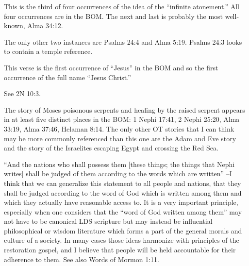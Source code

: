 \begin{compactdesc}
		\item[16$\vert$]
		\begin{compactdesc}
		\item[infinite atonement] This is the third of four occurrences of the idea of the ``infinite atonement.'' All four occurrences are in the BOM. The next and last is probably the most well-known, Alma 34:12.

		\item[pure hearts and clean hands] The only other two instances are Psalms 24:4 and Alma 5:19. Psalms 24:3 looks to contain a temple reference.
		\end{compactdesc}

		\item[19$\vert$]
		\begin{compactdesc}
		\item[Jesus] This verse is the first occurrence of ``Jesus'' in the BOM and so the first occurrence of the full name ``Jesus Christ.''

		\item[And according to the words of the prophets...] See 2N 10:3.
		\end{compactdesc}

		\item[20$\vert$]
		\begin{compactdesc}
		\item[poisonous serpents] The story of Moses poisonous serpents and healing by the raised serpent appears in at least five distinct places in the BOM: 1 Nephi 17:41, 2 Nephi 25:20, Alma 33:19, Alma 37:46, Helaman 8:14. The only other OT stories that I can think may be more commonly referenced than this one are the Adam and Eve story and the story of the Israelites escaping Egypt and crossing the Red Sea.
		\end{compactdesc}

		\item[22$\vert$]
		\begin{compactdesc}
		\item[shall be judged of them] ``And the nations who shall possess them [these things; the things that Nephi writes] shall be judged of them according to the words which are written'' --I think that we can generalize this statement to all people and nations, that they shall be judged according to the word of God which is written among them and which they actually have reasonable access to. It is a very important principle, especially when one considers that the ``word of God written among them'' may not have to be canonical LDS scripture but may instead be influential philosophical or wisdom literature which forms a part of the general morals and culture of a society. In many cases those ideas harmonize with principles of the restoration gospel, and I believe that people will be held accountable for their adherence to them. See also Words of Mormon 1:11.
		\end{compactdesc}


\end{compactdesc}
